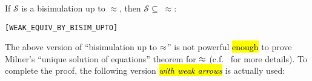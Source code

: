 \begin{theorem}
If $\mathcal{S}$ is a bisimulation up to $\approx$, then
$\mathcal{S} \subseteq\;\approx$:
\begin{alltt}
\HOLTokenTurnstile{}   \HOLSymConst{\HOLTokenConj{}}    \HOLSymConst{\HOLTokenImp{}}  \HOLSymConst{\HOLTokenWeakEQ} \hfill{[WEAK_EQUIV_BY_BISIM_UPTO]}
\end{alltt}
\end{theorem}

The above version of ``bisimulation up to $\approx$'' 
is not powerful \hl{enough} to prove Milner's ``unique solution of equations''
theorem for $\approx$ (c.f.~\cite{sangiorgi1992problem} for more details).
To complete the proof, the following version \hl{\emph{with weak arrows}} is
actually used:
